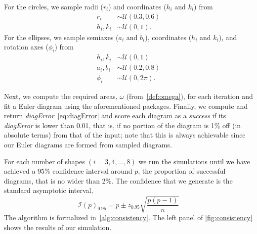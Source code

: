 \documentclass[
  oneside,
  openany,
  numbers=noendperiod,
  parskip=half,
  bibliography=totoc
]{scrbook}\usepackage[]{graphicx}\usepackage{xcolor}
\begin{document}
For the circles, we sample radii ($r_i$) and coordinates ($h_i$ and $k_i$) from
%
\begin{equation}
\begin{aligned}
r_i     & \sim \mathcal{U}(0.3, 0.6)\\
h_i,k_i & \sim \mathcal{U}(0, 1).
\end{aligned}
\label{eq:consistencyCircles}
\end{equation}
%
For the ellipses, we sample semiaxes ($a_i$ and $b_i$), coordinates
($h_i$ and $k_i$), and rotation axes ($\phi_i$) from
%
\begin{equation}
\begin{aligned}
h_i,k_i & \sim \mathcal{U}(0, 1)\\
a_i,b_i & \sim \mathcal{U}(0.2, 0.8)\\
\phi_i  & \sim \mathcal{U}(0, 2\pi).
\end{aligned}
\label{eq:consistencyEllipses}
\end{equation}

Next, we compute the required areas, $\omega$ (from~\cref{def:omega}), for each
iteration and fit a Euler diagram using the aforementioned packages. Finally,
we compute and return \emph{diagError}~\eqref{eq:diagError} and score each
diagram as a \emph{success} if its \emph{diagError} is lower than 0.01, that is,
if no portion of the diagram is 1\% off (in absolute terms) from that of the
input; note that this is always achievable since our Euler diagrams are formed
from sampled diagrams.

For each number of shapes $(i=3,4,\dots,8)$ we run the simulations until we have achieved a 95\% confidence interval around $p$, the proportion of successful diagrams, that is no wider than 2\%. The confidence that we generate is the standard asymptotic interval,
\begin{equation*}
\mathcal{I}(p)_{0.95} = p \pm z_{0.95}\sqrt{\frac{p(p-1)}{n}}
\end{equation*}
The algorithm is formalized in~\autoref{alg:consistency}. The left panel of
\cref{fig:consistency} shows the results of our simulation.
\end{document}
